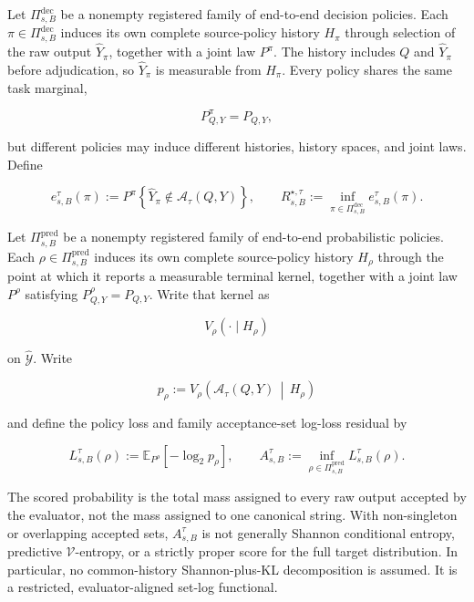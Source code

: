 \documentclass[10pt]{article} %
\providecommand{\1}{\mathbf{1}}  %
\theoremstyle{remark}
\theoremstyle{definition}
\begin{document}
Let $\Pi_{s,B}^{\mathrm{dec}}$ be a nonempty registered family of end-to-end decision policies. Each $\pi\in\Pi_{s,B}^{\mathrm{dec}}$ induces its own complete source-policy history $H_\pi$ through selection of the raw output $\widehat Y_\pi$, together with a joint law $P^\pi$. The history includes $Q$ and $\widehat Y_\pi$ before adjudication, so $\widehat Y_\pi$ is measurable from $H_\pi$. Every policy shares the same task marginal,

\begin{equation}
P^\pi_{Q,Y}=P_{Q,Y},
\end{equation}

but different policies may induce different histories, history spaces, and joint laws. Define

\begin{equation}
e_{s,B}^{\tau}(\pi)
:=
P^\pi\!\left\{
\widehat Y_\pi
\notin
\mathcal A_\tau(Q,Y)
\right\},
\qquad
R_{s,B}^{\star,\tau}
:=
\inf_{\pi\in\Pi_{s,B}^{\mathrm{dec}}}
e_{s,B}^{\tau}(\pi).
\label{eq:acceptance-decision-risk}
\end{equation}

Let $\Pi_{s,B}^{\mathrm{pred}}$ be a nonempty registered family of end-to-end probabilistic policies. Each $\rho\in\Pi_{s,B}^{\mathrm{pred}}$ induces its own complete source-policy history $H_\rho$ through the point at which it reports a measurable terminal kernel, together with a joint law $P^\rho$ satisfying $P^\rho_{Q,Y}=P_{Q,Y}$. Write that kernel as

\begin{equation}
V_\rho(\cdot\mid H_\rho)
\end{equation}

on $\widehat{\mathcal Y}$. Write

\begin{equation}
p_\rho
:=
V_\rho\!\left(
\mathcal A_\tau(Q,Y)
\,\middle|\,
H_\rho
\right)
\end{equation}

and define the policy loss and family acceptance-set log-loss residual by

\begin{equation}
L_{s,B}^{\tau}(\rho)
:=
\mathbb E_{P^\rho}\!\left[
-\log_2 p_\rho
\right],
\qquad
A_{s,B}^{\tau}
:=
\inf_{\rho\in\Pi_{s,B}^{\mathrm{pred}}}
L_{s,B}^{\tau}(\rho).
\label{eq:acceptance-set-residual}
\end{equation}

The scored probability is the total mass assigned to every raw output accepted by the evaluator, not the mass assigned to one canonical string. With non-singleton or overlapping accepted sets, $A_{s,B}^{\tau}$ is not generally Shannon conditional entropy, predictive $\mathcal V$-entropy, or a strictly proper score for the full target distribution. In particular, no common-history Shannon-plus-KL decomposition is assumed. It is a restricted, evaluator-aligned set-log functional.
\end{document}
